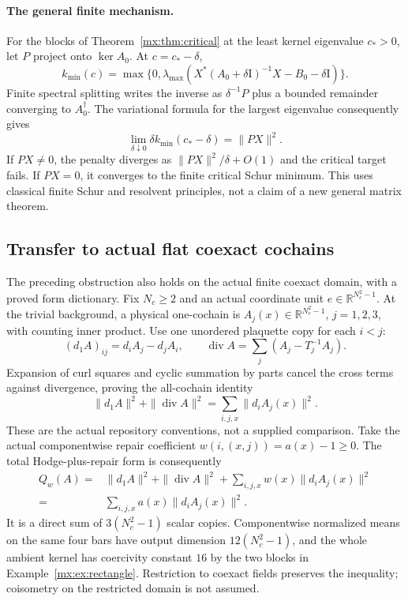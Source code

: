 \documentclass[11pt]{article}
\newcommand{\R}{\mathbb R}
\providecommand{\id}{\mathrm I}
\begin{document}
\paragraph{The general finite mechanism.}
For the blocks of Theorem~\ref{mx:thm:critical} at the least kernel eigenvalue $c_*>0$,
let $P$ project onto $\ker A_0$. At $c=c_*-\delta$,
\[
 k_{\min}(c)=\max\{0,\lambda_{\max}(
 X^*(A_0+\delta\id)^{-1}X-B_0-\delta\id)\}.
\]
Finite spectral splitting writes the inverse as $\delta^{-1}P$ plus a
bounded remainder converging to $A_0^\dagger$. The variational formula
for the largest eigenvalue consequently gives
\[
 \lim_{\delta\downarrow0}\delta k_{\min}(c_*-\delta)=\|PX\|^2.
\]
If $PX\ne0$, the penalty diverges as $\|PX\|^2/\delta+O(1)$ and the
critical target fails. If $PX=0$, it converges to the finite critical
Schur minimum. This uses classical finite Schur and resolvent principles,
not a claim of a new general matrix theorem.

\subsection{Transfer to actual flat coexact cochains}
The preceding obstruction also holds on the actual finite coexact domain,
with a proved form dictionary. Fix $N_c\geq2$ and an actual coordinate unit
$e\in\R^{N_c^2-1}$. At the trivial background, a physical one-cochain is
$A_j(x)\in\R^{N_c^2-1}$, $j=1,2,3$, with counting inner product. Use one
unordered plaquette copy for each $i<j$:
\[
 (d_1 A)_{ij}=d_iA_j-d_jA_i,\qquad
 \operatorname{div}A=\sum_j(A_j-T_j^{-1}A_j).
\]
Expansion of curl squares and cyclic summation by parts cancel the cross
terms against divergence, proving the all-cochain identity
\[
 \|d_1A\|^2+\|\operatorname{div}A\|^2=\sum_{i,j,x}\|d_iA_j(x)\|^2.
\]
These are the actual repository conventions, not a supplied comparison.
Take the actual componentwise repair coefficient $w(i,(x,j))=a(x)-1\geq0$.
The total Hodge-plus-repair form is consequently
\begin{equation}\label{mx:eq:physical-dictionary}
 \begin{aligned} Q_w(A)={}&\|d_1A\|^2+\|\operatorname{div}A\|^2+
 \sum_{i,j,x}w(x)\|d_iA_j(x)\|^2
 \\ ={}&\sum_{i,j,x}a(x)\|d_iA_j(x)\|^2. \end{aligned}
\end{equation}
It is a direct sum of $3(N_c^2-1)$ scalar copies. Componentwise normalized
means on the same four bars have output dimension $12(N_c^2-1)$, and
the whole ambient kernel has coercivity constant $16$ by the two blocks
in Example~\ref{mx:ex:rectangle}. Restriction to coexact fields preserves the
inequality; coisometry on the restricted domain is not assumed.
\end{document}

